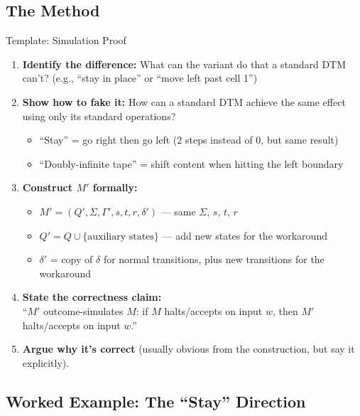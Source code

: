 \documentclass[11pt,a4paper]{article}
\begin{document}
\subsection{The Method}

\begin{templatebox}{Template: Simulation Proof}
\begin{enumerate}
    \item \textbf{Identify the difference:} What can the variant do that a standard DTM can't? (e.g., ``stay in place'' or ``move left past cell 1'')

    \item \textbf{Show how to fake it:} How can a standard DTM achieve the same effect using only its standard operations?
    \begin{itemize}
        \item ``Stay'' = go right then go left (2 steps instead of 0, but same result)
        \item ``Doubly-infinite tape'' = shift content when hitting the left boundary
    \end{itemize}

    \item \textbf{Construct $M'$ formally:}
    \begin{itemize}
        \item $M' = (Q', \Sigma, \Gamma', s, t, r, \delta')$ --- same $\Sigma$, $s$, $t$, $r$
        \item $Q' = Q \cup \{\text{auxiliary states}\}$ --- add new states for the workaround
        \item $\delta'$ = copy of $\delta$ for normal transitions, plus new transitions for the workaround
    \end{itemize}

    \item \textbf{State the correctness claim:}\\
    ``$M'$ outcome-simulates $M$: if $M$ halts/accepts on input $w$, then $M'$ halts/accepts on input $w$.''

    \item \textbf{Argue why it's correct} (usually obvious from the construction, but say it explicitly).
\end{enumerate}
\end{templatebox}

\subsection{Worked Example: The ``Stay'' Direction}
\end{document}
